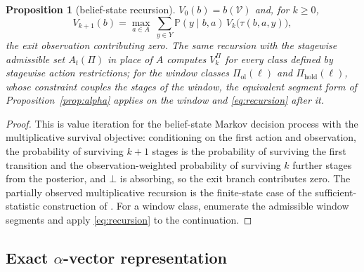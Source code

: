 \documentclass[11pt,a4paper]{article}
\theoremstyle{plain}
\newtheorem{proposition}[theorem]{Proposition}
\theoremstyle{definition}
\theoremstyle{remark}
\newcommand{\Prob}{\mathbb{P}}
\newcommand{\calV}{\mathcal{V}}
\newcommand{\hold}{\mathrm{hold}}
\newcommand{\ol}{\mathrm{ol}}
\begin{document}
\begin{proposition}[belief-state recursion]\label{prop:recursion}
$V_0(b)=b(\calV)$ and, for $k\ge0$,
\begin{equation}\label{eq:recursion}
V_{k+1}(b)=\max_{a\in A}\ \sum_{y\in Y}\Prob(y\mid b,a)\,V_{k}\bigl(\tau(b,a,y)\bigr),
\end{equation}
the exit observation contributing zero. The same recursion with the stagewise admissible set $A_t(\Pi)$ in place of $A$ computes $V^{\Pi}_k$ for every class defined by stagewise action restrictions; for the window classes $\Pi_{\ol}(\ell)$ and $\Pi_{\hold}(\ell)$, whose constraint couples the stages of the window, the equivalent segment form of Proposition~\ref{prop:alpha} applies on the window and \eqref{eq:recursion} after it.
\end{proposition}

\begin{proof}
This is value iteration for the belief-state Markov decision process \cite{Astrom1965,SmallwoodSondik1973,BertsekasShreve1978} with the multiplicative survival objective: conditioning on the first action and observation, the probability of surviving $k+1$ stages is the probability of surviving the first transition and the observation-weighted probability of surviving $k$ further stages from the posterior, and $\bot$ is absorbing, so the exit branch contributes zero. The partially observed multiplicative recursion is the finite-state case of the sufficient-statistic construction of \cite{LesserOishi2014}. For a window class, enumerate the admissible window segments and apply \eqref{eq:recursion} to the continuation.
\end{proof}

\subsection{Exact $\alpha$-vector representation}
\end{document}
